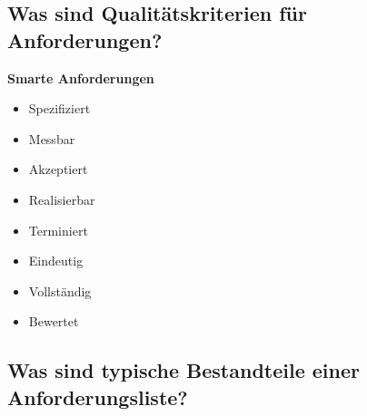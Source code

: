 \subsection{Was sind Qualitätskriterien für Anforderungen?}

\textbf{Smarte Anforderungen}
\begin{itemize}
    \item Spezifiziert
    \item Messbar
    \item Akzeptiert
    \item Realisierbar
    \item Terminiert
    \item Eindeutig
    \item Vollständig
    \item Bewertet
\end{itemize}

\subsection{Was sind typische Bestandteile einer Anforderungsliste?}

